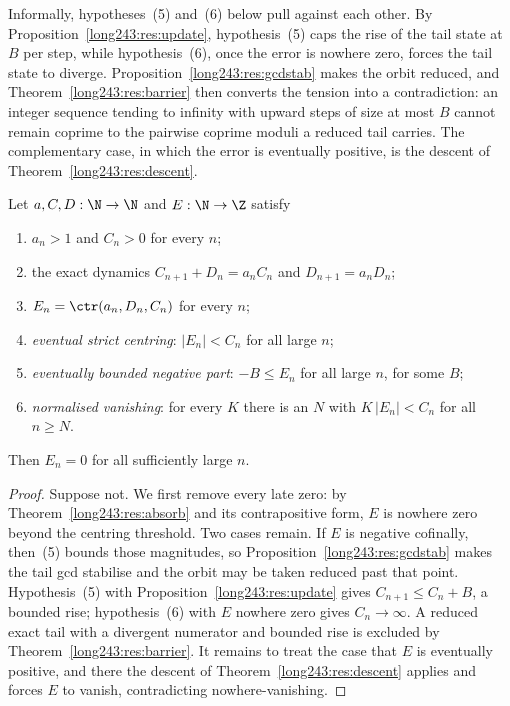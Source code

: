 Informally, hypotheses~(5) and~(6) below pull against each other.  By
Proposition~\ref{long243:res:update}, hypothesis~(5) caps the rise of the tail state at
$B$ per step, while hypothesis~(6), once the error is nowhere zero, forces the
tail state to diverge.  Proposition~\ref{long243:res:gcdstab} makes the orbit reduced,
and Theorem~\ref{long243:res:barrier} then converts the tension into a contradiction:
an integer sequence tending to infinity with upward steps of size at most $B$
cannot remain coprime to the pairwise coprime moduli a reduced tail carries.
The
complementary case, in which the error is eventually positive, is the descent
of Theorem~\ref{long243:res:descent}.

\begin{theorem}\label{long243:res:bounded}
Let $a,C,D:\N\to\N$ and $E:\N\to\Z$ satisfy
\begin{enumerate}
\item $a_n>1$ and $C_n>0$ for every $n$;
\item the exact dynamics $C_{n+1}+D_n=a_nC_n$ and $D_{n+1}=a_nD_n$;
\item $E_n=\ctr(a_n,D_n,C_n)$ for every $n$;
\item \emph{eventual strict centring}: $|E_n|<C_n$ for all large $n$;
\item \emph{eventually bounded negative part}: $-B\le E_n$ for all large $n$,
for some $B$;
\item \emph{normalised vanishing}: for every $K$ there is an $N$ with
$K\,|E_n|<C_n$ for all $n\ge N$.
\end{enumerate}
Then $E_n=0$ for all sufficiently large $n$.
\end{theorem}

\begin{proof}
Suppose not.  We first remove every late zero: by Theorem~\ref{long243:res:absorb} and
its contrapositive form, $E$ is nowhere zero beyond the centring threshold.
Two cases remain.  If $E$ is negative cofinally,
then~(5) bounds those magnitudes, so Proposition~\ref{long243:res:gcdstab} makes the
tail gcd stabilise and the orbit may be taken reduced past that point.
Hypothesis~(5) with
Proposition~\ref{long243:res:update} gives $C_{n+1}\le C_n+B$, a bounded rise;
hypothesis~(6) with $E$ nowhere zero gives $C_n\to\infty$.  A reduced exact
tail with a divergent numerator and bounded rise is excluded by
Theorem~\ref{long243:res:barrier}.  It remains to treat the case that $E$ is eventually
positive, and there the descent
of Theorem~\ref{long243:res:descent} applies and forces $E$ to vanish, contradicting
nowhere-vanishing.
\end{proof}

